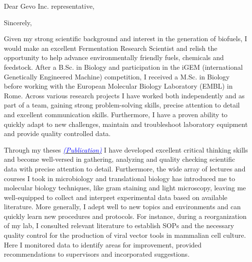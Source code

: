 \documentclass[11pt,a4paper,sans]{moderncv}
\begin{document}
\date{\today}
\opening{Dear Gevo Inc. representative,\vspace{-2mm}}
\closing{Sincerely,\vspace*{-4mm} }
\makelettertitle
\begin{spacing}{1.1}

Given my strong scientific background and interest in the generation of biofuels, I would make an excellent Fermentation Research Scientist and relish the opportunity to help advance environmentally friendly fuels, chemicals and feedstock. After a B.Sc. in Biology and participation in the iGEM (international Genetically Engineered Machine) competition, I received a M.Sc. in Biology before working with the European Molecular Biology Laboratory (EMBL) in Rome. Across various research projects I have worked both independently and as part of a team, gaining strong problem-solving skills, precise attention to detail and excellent communication skills. Furthermore, I have a proven ability to quickly adapt to new challenges, maintain and troubleshoot laboratory equipment and provide quality controlled data.\par\vspace*{1mm}

Through my theses {\href{https://www.ncbi.nlm.nih.gov/pubmed/29517395}{\textcolor{blue}{{\textit{(Publication)}}}}} I have developed excellent critical thinking skills and become well-versed in gathering, analyzing and quality checking scientific data with precise attention to detail. Furthermore, the wide array of lectures and courses I took in microbiology and translational biology has introduced me to molecular biology techniques, like gram staining and light microscopy, leaving me well-equipped to collect and interpret experimental data based on available literature. More generally, I adept well to new topics and environments and can quickly learn new procedures and protocols. For instance, during a reorganization of my  lab, I consulted relevant literature to establish SOPs and the necessary quality control for the production of viral vector tools in mammalian cell culture. Here I monitored data to identify areas for improvement, provided recommendations to supervisors and incorporated suggestions.\par\vspace{1mm} 


\end{spacing}
\end{document}

